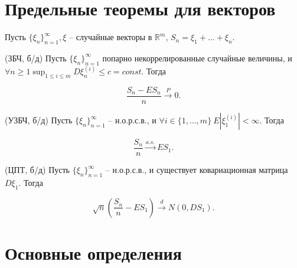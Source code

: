 \section{Предельные теоремы для векторов}

Пусть $\displaystyle \{\xi _{n}\}_{n=1}^{\infty } ,\xi $ -- случайные векторы в $\displaystyle \mathbb{R}^{m}$, $\displaystyle S_{n} =\xi _{1} +\dotsc +\xi _{n}$.
\begin{theorem}
	(ЗБЧ, б/д) Пусть $\displaystyle \{\xi _{n}\}_{n=1}^{\infty}$ попарно некоррелированные случайные величины, и $\displaystyle \forall n \ge 1 \sup_{1\le i\le m} D\xi _{n}^{( i)} \leqslant c=const$. Тогда
	
	
	\begin{equation*}
		\frac{S_{n} -ES_{n}}{n}\xrightarrow{P} 0.
	\end{equation*}
\end{theorem}
\begin{theorem}
	(УЗБЧ, б/д) Пусть $\displaystyle \{\xi _{n}\}_{n=1}^{\infty }$ -- н.о.р.с.в., и $\displaystyle \forall i\in \{1,\dotsc ,m\} \ E\left| \xi _{1}^{( i)}\right| < \infty $. Тогда
	
	
	\begin{equation*}
		\frac{S_{n}}{n}\xrightarrow{a.s.} ES_{1} .
	\end{equation*}
\end{theorem}
\begin{theorem}
	(ЦПТ, б/д) Пусть $\displaystyle \{\xi _{n}\}_{n=1}^{\infty }$ -- н.о.р.с.в., и существует ковариационная матрица $\displaystyle D\xi _{1}$. Тогда
	
	
	\begin{equation*}
		\sqrt{n}\left(\frac{S_{n}}{n} -ES_{1}\right)\xrightarrow{d} N( 0,DS_{1}) .
	\end{equation*}
\end{theorem}

\section{Основные определения}

